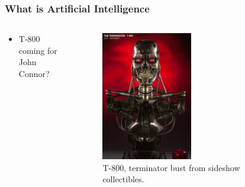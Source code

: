\documentclass[aspectratio=169]{beamer}
\begin{document}
  \begin{frame}
    \frametitle{What is Artificial Intelligence}
    \begin{columns}
      \begin{column}{0.5\textwidth}
        \begin{itemize}
          \item T-800 coming for John Connor?
        \end{itemize}
      \end{column}
      \begin{column}{0.5\textwidth}
        \begin{figure}[th!]
          \centering
          \includegraphics[width=0.5\textwidth]{t800.jpg}
          \caption{T-800, terminator bust from sideshow collectibles.}
          \label{fig:jim_carrey}
        \end{figure}
      \end{column}
    \end{columns}
  \end{frame}
\end{document}
